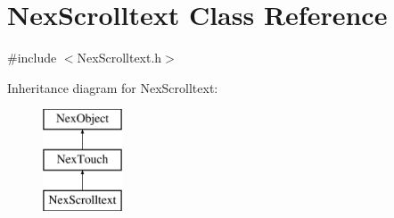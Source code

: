 \hypertarget{class_nex_scrolltext}{\section{Nex\+Scrolltext Class Reference}
\label{class_nex_scrolltext}
}


{\ttfamily \#include $<$Nex\+Scrolltext.\+h$>$}

Inheritance diagram for Nex\+Scrolltext\+:\begin{figure}[H]
\begin{center}
\leavevmode
\includegraphics[height=3.000000cm]{class_nex_scrolltext}
\end{center}
\end{figure}

